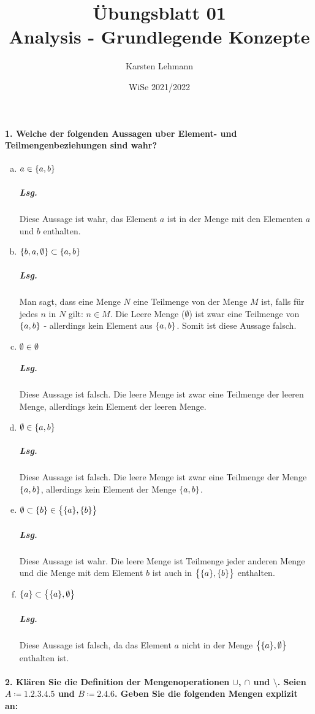 \documentclass{scrreprt}
\author{Karsten Lehmann}
\date{WiSe 2021/2022}
\title{Übungsblatt 01\\Analysis - Grundlegende Konzepte}
\begin{document}
\paragraph{1. Welche der folgenden Aussagen uber Element- und Teilmengenbeziehungen sind wahr?}

\begin{enumerate}[a)]
\item $a \in \qty{a, b}$

  \subparagraph{Lsg.} Diese Aussage ist wahr, das Element $a$ ist in der Menge
  mit den Elementen $a$ und $b$ enthalten.

\item $\qty{b, a, \emptyset} \subset \qty{a, b}$

  \subparagraph{Lsg.} Man sagt, dass eine Menge $N$ eine Teilmenge von der Menge
  $M$ ist, falls für jedes $n$ in $N$ gilt: $n \in M$.
  Die Leere Menge ($\emptyset$) ist zwar eine Teilmenge von $\qty{a, b}$ -
  allerdings kein Element aus $\qty{a, b}$.
  Somit ist diese Aussage falsch.

\item $\emptyset \in \emptyset$

  \subparagraph{Lsg.} Diese Aussage ist falsch.
  Die leere Menge ist zwar eine Teilmenge der leeren Menge, allerdings kein
  Element der leeren Menge.

\item $\emptyset \in \qty{a, b}$

  \subparagraph{Lsg.} Diese Aussage ist falsch.
  Die leere Menge ist zwar eine Teilmenge der Menge $\qty{a, b}$, allerdings kein
  Element der Menge $\qty{a, b}$.

\item $\emptyset \subset \qty{b} \in \qty\big{\qty{a}, \qty{b}}$

  \subparagraph{Lsg.} Diese Aussage ist wahr.
  Die leere Menge ist Teilmenge jeder anderen Menge und die Menge mit dem
  Element $b$ ist auch in $\qty\big{\qty{a}, \qty{b}}$ enthalten.

\item $\qty{a} \subset \qty\big{\qty{a}, \emptyset}$

  \subparagraph{Lsg.} Diese Aussage ist falsch, da das Element $a$ nicht in
  der Menge $\qty\big{\qty{a}, \emptyset}$ enthalten ist.
\end{enumerate}

\newpage
\paragraph{2. Klären Sie die Definition der Mengenoperationen $\cup$, $\cap$ und $\setminus$.
  Seien $A \coloneqq \qty{1, 2, 3, 4, 5}$ und $B \coloneqq \qty{2, 4, 6}$.
  Geben Sie die folgenden Mengen explizit an:}
\end{document}
